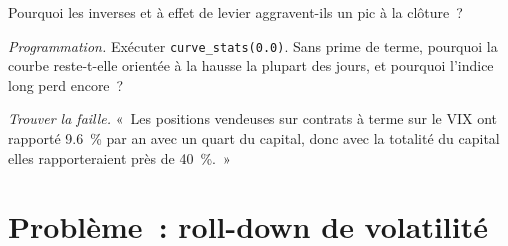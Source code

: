 \begin{exercise}[$\star\star$]\label{exo:s2:the-volatility-index-complex:6}
Pourquoi les  inverses et à effet de levier aggravent-ils un pic à la clôture~?
\end{exercise}

\begin{exercise}[$\star\star\star$]\label{exo:s2:the-volatility-index-complex:7}
\emph{Programmation.} Exécuter \texttt{curve\_stats(0.0)}. Sans prime de terme, pourquoi la courbe reste-t-elle orientée à la hausse la plupart des jours, et pourquoi l'indice long
perd encore~?
\end{exercise}

\begin{exercise}[$\star\star\star$]\label{exo:s2:the-volatility-index-complex:8}
\emph{Trouver la faille.} «~Les positions vendeuses sur contrats à terme sur le VIX ont rapporté 9.6~\% par an avec un quart du capital, donc avec la totalité du capital elles rapporteraient près de 40~\%.~»
\end{exercise}

\section{Problème~: roll-down de volatilité}


